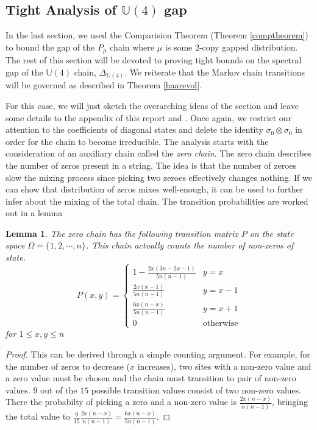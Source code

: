 \documentclass[12pt]{amsart}
\newtheorem{lemma}[theorem]{Lemma}
\theoremstyle{definition}
\theoremstyle{remark}
\numberwithin{equation}{section}
\theoremstyle{remark}
\begin{document}
\subsection{Tight Analysis of $\mathbb{U}(4)$ gap}
In the last section, we used the Comparision Theorem (Theorem \ref{comptheorem}) to bound the gap of the $P_\mu$ chain where $\mu$ is some 2-copy gapped distribution. The rest of this section will be devoted to proving tight bounds on the spectral gap of the $\mathbb{U}(4)$ chain, $\Delta_{\mathbb{U}(4)}$. We reiterate that the Markov chain transitions will be governed as described in Theorem \ref{haarevol}. \newline

For this case, we will just sketch the overarching ideas of the section and leave some details to the appendix of this report and \cite{harrlow}. Once again, we restrict our attention to the coefficients of diagonal states and delete the identity $\sigma_0 \otimes \sigma_0$ in order for the chain to become irreducible. The analysis starts with the consideration of an auxiliary chain called the \emph{zero chain}. The zero chain describes the number of zeros present in a string. The idea is that the number of zeroes slow the mixing process since picking two zeroes effectively changes nothing. If we can show that distribution of zeros mixes well-enough, it can be used to further infer about the mixing of the total chain.
The transition probabilities are worked out in a lemma
%
\begin{lemma} \label{zerochain}
  The zero chain has the following transition matrix $P$ on the state space $\Omega = \{1,2, \cdots,n\}$. This chain actually counts the number of non-zeros of state.
  \begin{equation}
    P(x,y) = \begin{cases}
    1 - \frac{2x(3n-2x -1)}{5n(n-1)} & y = x \\
    \frac{2x(x-1)}{5n(n-1)} & y = x - 1 \\
    \frac{6x(n-x)}{5n(n-1)} & y = x + 1 \\
    0 & \text{otherwise}
    \end{cases}
  \end{equation}
  for $1 \leq x,y \leq n$
\end{lemma}
\begin{proof}
  This can be derived through a simple counting argument. For example, for the number of zeros to decrease ($x$ increases), two sites with a non-zero value and a zero value must be chosen and the chain must transition to pair of non-zero values. $9$ out of the $15$ possible transition values consist of two non-zero values. There the probabilty of picking a zero and a non-zero value is $\frac{2x(n-x)}{n(n-1)}$, bringing the total value to $\frac{9}{15}\frac{2x(n-x)}{n(n-1)} = \frac{6x(n-x)}{5n(n-1)}$.
\end{proof}
\end{document}
